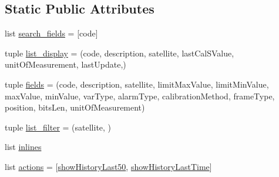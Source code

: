 \subsection*{Static Public Attributes}
\begin{DoxyCompactItemize}
\item 
list \hyperlink{class_ground_segment_1_1admin_1_1_tmly_var_type_admin_aa4fbcc6eced9e293ccee1adc138c4728}{search\+\_\+fields} = \mbox{[}\textquotesingle{}code\textquotesingle{}\mbox{]}
\item 
tuple \hyperlink{class_ground_segment_1_1admin_1_1_tmly_var_type_admin_aa75f4221ac105012fa994d5022cafd6c}{list\+\_\+display} = (\textquotesingle{}code\textquotesingle{}, \textquotesingle{}description\textquotesingle{}, \textquotesingle{}satellite\textquotesingle{}, \textquotesingle{}last\+Cal\+S\+Value\textquotesingle{}, \textquotesingle{}unit\+Of\+Measurement\textquotesingle{}, \textquotesingle{}last\+Update\textquotesingle{},)
\item 
tuple \hyperlink{class_ground_segment_1_1admin_1_1_tmly_var_type_admin_aef2423842950903780b669c9d0118978}{fields} = (\textquotesingle{}code\textquotesingle{}, \textquotesingle{}description\textquotesingle{}, \textquotesingle{}satellite\textquotesingle{}, \textquotesingle{}limit\+Max\+Value\textquotesingle{}, \textquotesingle{}limit\+Min\+Value\textquotesingle{}, \textquotesingle{}max\+Value\textquotesingle{}, \textquotesingle{}min\+Value\textquotesingle{}, \textquotesingle{}var\+Type\textquotesingle{}, \textquotesingle{}alarm\+Type\textquotesingle{}, \textquotesingle{}calibration\+Method\textquotesingle{}, \textquotesingle{}frame\+Type\textquotesingle{}, \textquotesingle{}position\textquotesingle{}, \textquotesingle{}bits\+Len\textquotesingle{}, \textquotesingle{}unit\+Of\+Measurement\textquotesingle{})
\item 
tuple \hyperlink{class_ground_segment_1_1admin_1_1_tmly_var_type_admin_ae6c46f02641f1897cceac59963725ab4}{list\+\_\+filter} = (\textquotesingle{}satellite\textquotesingle{}, )
\item 
list \hyperlink{class_ground_segment_1_1admin_1_1_tmly_var_type_admin_a055edc4b536c6a55123bdf1f81b0120b}{inlines}
\item 
list \hyperlink{class_ground_segment_1_1admin_1_1_tmly_var_type_admin_a50f7af923ce7249b9dbffd30b1498a3f}{actions} = \mbox{[}\hyperlink{namespace_ground_segment_1_1admin_a682b5d47d4b4131c8fb49180a2c702c4}{show\+History\+Last50}, \hyperlink{namespace_ground_segment_1_1admin_acedf79afa40e10477e21ec210f122733}{show\+History\+Last\+Time}\mbox{]}
\end{DoxyCompactItemize}


